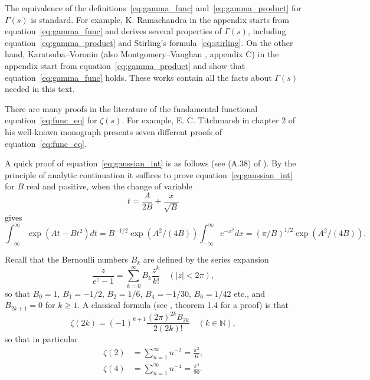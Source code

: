 \documentclass[11pt]{article}
\begin{document}
The equivalence of the definitions~\eqref{eq:gamma_func} and~\eqref{eq:gamma_product} for $\Gamma(s)$ is standard. For example, K. Ramachandra \cite{Ram} in the appendix starts from equation~\eqref{eq:gamma_func} and derives several properties of $\Gamma(s)$, including equation~\eqref{eq:gamma_product} and Stirling's formula~\eqref{eq:stirling}. On the other hand, Karatsuba–Voronin \cite{KaVo} (also Montgomery–Vaughan \cite{MoVa}, appendix C) in the appendix start from equation~\eqref{eq:gamma_product} and show that equation~\eqref{eq:gamma_func} holds. These works contain all the facts about $\Gamma(s)$ needed in this text.

There are many proofs in the literature of the fundamental functional equation~\eqref{eq:func_eq} for $\zeta(s)$. For example, E. C. Titchmarsh \cite{Tit3} in chapter 2 of his well-known monograph presents seven different proofs of equation~\eqref{eq:func_eq}.

A quick proof of equation~\eqref{eq:gaussian_int} is as follows (see (A.38) of \cite{Iv1}). By the principle of analytic continuation it suffices to prove equation~\eqref{eq:gaussian_int} for $B$ real and positive, when the change of variable
\begin{equation}\label{eq:gaussian_substitution}
t = \frac{A}{2B} + \frac{x}{\sqrt{B}}
\end{equation}
gives
\begin{equation}\label{eq:gaussian_proof}
\int_{-\infty}^{\infty} \exp(At - Bt^2) dt = B^{-1/2} \exp(A^2/(4B)) \int_{-\infty}^{\infty} e^{-x^2} dx = (\pi/B)^{1/2} \exp(A^2/(4B)).
\end{equation}

Recall that the Bernoulli numbers $B_k$ are defined by the series expansion
\begin{equation}\label{eq:bernoulli_def}
\frac{z}{e^z - 1} = \sum_{k=0}^{\infty} B_k \frac{z^k}{k!} \quad (|z| < 2\pi),
\end{equation}
so that $B_0 = 1$, $B_1 = -1/2$, $B_2 = 1/6$, $B_4 = -1/30$, $B_6 = 1/42$ etc., and $B_{2k+1} = 0$ for $k \geq 1$. A classical formula (see \cite{Iv1}, theorem 1.4 for a proof) is that
\begin{equation}\label{eq:zeta_even}
\zeta(2k) = (-1)^{k+1} \frac{(2\pi)^{2k} B_{2k}}{2(2k)!} \quad (k \in \mathbb{N}),
\end{equation}
so that in particular
\begin{align}\label{eq:zeta_examples}
\zeta(2) &= \sum_{n=1}^{\infty} n^{-2} = \frac{\pi^2}{6}, \\
\zeta(4) &= \sum_{n=1}^{\infty} n^{-4} = \frac{\pi^4}{90}. \nonumber
\end{align}
\end{document}
